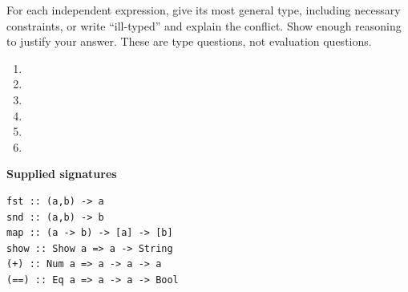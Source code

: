 


\mockrules
For each independent expression, give its most general type, including necessary
constraints, or write ``ill-typed'' and explain the conflict. Show enough reasoning
to justify your answer. These are type questions, not evaluation questions.
\begin{enumerate}[label=(\alph*)]
\item {}
\item \code{\xs -> [x | x <- xs, x]}
\item {}
\item {}
\item {}
\item {}
\end{enumerate}
\textbf{Supplied signatures}
\par\noindent\begin{minipage}{\linewidth}
\begin{lstlisting}
fst :: (a,b) -> a
snd :: (a,b) -> b
map :: (a -> b) -> [a] -> [b]
show :: Show a => a -> String
(+) :: Num a => a -> a -> a
(==) :: Eq a => a -> a -> Bool
\end{lstlisting}
\end{minipage}\par


